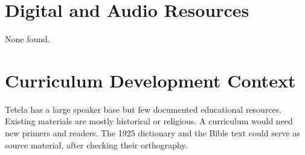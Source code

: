 \documentclass[12pt]{article}
\begin{document}
\section{Digital and Audio Resources}
None found.

\section{Curriculum Development Context}
Tetela has a large speaker base but few documented educational resources. Existing materials are mostly historical or religious. A curriculum would need new primers and readers. The 1925 dictionary and the Bible text could serve as source material, after checking their orthography.
\end{document}
